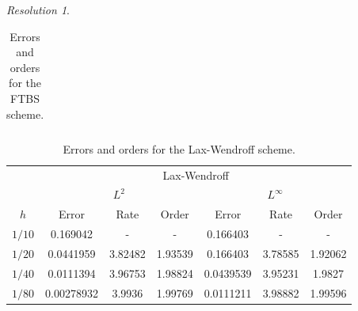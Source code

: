 \documentclass[10pt,a4paper]{article}
\theoremstyle{definition}
\theoremstyle{remark}
\newtheorem*{res}{Resolution}
\begin{document}
\begin{res}
\begin{table}[ht]
\begin{tabular}{|c||c|c|c|c|c|c|}
      \hline
    \end{tabular}
    \caption{Errors and orders for the FTBS scheme.}
  \end{table}\vspace{-0.4cm}
  \begin{table}[ht]
    \centering
    \begin{tabular}{|c||c|c|c|c|c|c|}
      \hline
             & \multicolumn{6}{c|}{Lax-Wendroff}                                                                             \\
      \cline{2-7}
             & \multicolumn{3}{c|}{$L^2$}        & \multicolumn{3}{c|}{$L^\infty$}                                           \\
      \cline{2-7}
      $h$    & Error                             & Rate                            & Order   & Error     & Rate    & Order   \\
      \hline\hline
      $1/10$ & 0.169042                          & -                               & -       & 0.166403  & -       & -       \\
      $1/20$ & 0.0441959                         & 3.82482                         & 1.93539 & 0.166403  & 3.78585 & 1.92062 \\
      $1/40$ & 0.0111394                         & 3.96753                         & 1.98824 & 0.0439539 & 3.95231 & 1.9827  \\
      $1/80$ & 0.00278932                        & 3.9936                          & 1.99769 & 0.0111211 & 3.98882 & 1.99596 \\
      \hline
    \end{tabular}
    \caption{Errors and orders for the Lax-Wendroff scheme.}
  \end{table}


\end{res}
\end{document}
